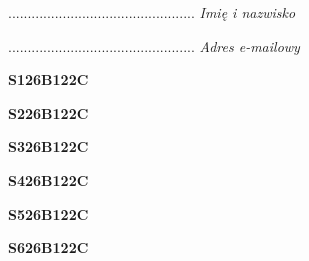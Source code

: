 \begin{turn}{90}\begin{minipage}{\linewidth} \vspace{20mm} ................................................  \textit{Imię i nazwisko}\end{minipage}\end{turn}

\begin{turn}{90}\begin{minipage}{\linewidth} \vspace{20mm} ................................................  \textit{Adres e-mailowy}\end{minipage}\end{turn}

\begin{turn}{90}\huge \begin{minipage}{\linewidth} \vspace{10mm}\textbf{S126B122C}\end{minipage}\end{turn}

\begin{turn}{90}\huge \begin{minipage}{\linewidth} \vspace{10mm}\textbf{S226B122C}\end{minipage}\end{turn}

\begin{turn}{90}\huge \begin{minipage}{\linewidth} \vspace{10mm}\textbf{S326B122C}\end{minipage}\end{turn}

\begin{turn}{90}\huge \begin{minipage}{\linewidth} \vspace{10mm}\textbf{S426B122C}\end{minipage}\end{turn}

\begin{turn}{90}\huge \begin{minipage}{\linewidth} \vspace{10mm}\textbf{S526B122C}\end{minipage}\end{turn}

\begin{turn}{90}\huge \begin{minipage}{\linewidth} \vspace{10mm}\textbf{S626B122C}\end{minipage}\end{turn}

